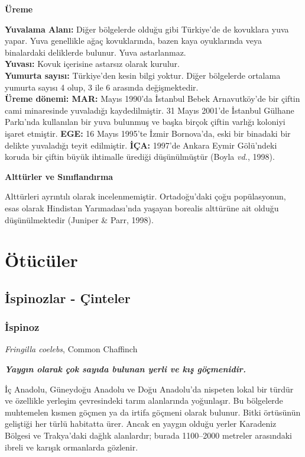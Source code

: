 \documentclass[
  10.5pt,
  a4paper,
  DIV=11,
  numbers=noendperiod,
  twocolumn]{scrreprt}
\begin{document}
\textbf{Üreme}

\textbf{Yuvalama Alanı:} Diğer bölgelerde olduğu gibi Türkiye'de de
kovuklara yuva yapar. Yuva genellikle ağaç kovuklarında, bazen kaya
oyuklarında veya binalardaki deliklerde bulunur. Yuva astarlanmaz.\\
\textbf{Yuvası:} Kovuk içerisine astarsız olarak kurulur.\\
\textbf{Yumurta sayısı:} Türkiye'den kesin bilgi yoktur. Diğer
bölgelerde ortalama yumurta sayısı 4 olup, 3 ile 6 arasında
değişmektedir.\\
\textbf{Üreme dönemi: MAR:} Mayıs 1990'da İstanbul Bebek Arnavutköy'de
bir çiftin cami minaresinde yuvaladığı kaydedilmiştir. 31 Mayıs 2001'de
İstanbul Gülhane Parkı'nda kullanılan bir yuva bulunmuş ve başka birçok
çiftin varlığı koloniyi işaret etmiştir. \textbf{EGE:} 16 Mayıs 1995'te
İzmir Bornova'da, eski bir binadaki bir delikte yuvaladığı teyit
edilmiştir. \textbf{İÇA:} 1997'de Ankara Eymir Gölü'ndeki koruda bir
çiftin büyük ihtimalle ürediği düşünülmüştür (Boyla \emph{vd.}, 1998).

\textbf{Alttürler ve Sınıflandırma}

Alttürleri ayrıntılı olarak incelenmemiştir. Ortadoğu'daki çoğu
popülasyonun, esas olarak Hindistan Yarımadası'nda yaşayan borealis
alttürüne ait olduğu düşünülmektedir (Juniper \& Parr, 1998).

\part{Ötücüler}

\chapter{İspinozlar - Çinteler}\label{ispinozlar---uxe7inteler}

\section{İspinoz}\label{ispinoz}

\emph{Fringilla coelebs}, Common Chaffinch

\textbf{\emph{Yaygın olarak çok sayıda bulunan yerli ve kış
göçmenidir.}}

İç Anadolu, Güneydoğu Anadolu ve Doğu Anadolu'da nispeten lokal bir
türdür ve özellikle yerleşim çevresindeki tarım alanlarında yoğunlaşır.
Bu bölgelerde muhtemelen kısmen göçmen ya da irtifa göçmeni olarak
bulunur. Bitki örtüsünün geliştiği her türlü habitatta ürer. Ancak en
yaygın olduğu yerler Karadeniz Bölgesi ve Trakya'daki dağlık alanlardır;
burada 1100--2000 metreler arasındaki ibreli ve karışık ormanlarda
gözlenir.
\end{document}

